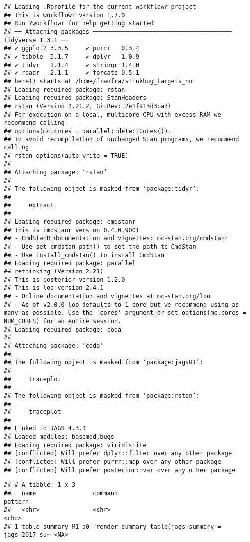 \documentclass[
]{article}
\begin{document}
\begin{verbatim}
## Loading .Rprofile for the current workflowr project
## This is workflowr version 1.7.0
## Run ?workflowr for help getting started
## ── Attaching packages ─────────────────────────────────────── tidyverse 1.3.1 ──
## ✔ ggplot2 3.3.5     ✔ purrr   0.3.4
## ✔ tibble  3.1.7     ✔ dplyr   1.0.9
## ✔ tidyr   1.1.4     ✔ stringr 1.4.0
## ✔ readr   2.1.1     ✔ forcats 0.5.1
## here() starts at /home/franfra/stinkbug_targets_nn
## Loading required package: rstan
## Loading required package: StanHeaders
## rstan (Version 2.21.2, GitRev: 2e1f913d3ca3)
## For execution on a local, multicore CPU with excess RAM we recommend calling
## options(mc.cores = parallel::detectCores()).
## To avoid recompilation of unchanged Stan programs, we recommend calling
## rstan_options(auto_write = TRUE)
## 
## Attaching package: ‘rstan’
## 
## The following object is masked from ‘package:tidyr’:
## 
##     extract
## 
## Loading required package: cmdstanr
## This is cmdstanr version 0.4.0.9001
## - CmdStanR documentation and vignettes: mc-stan.org/cmdstanr
## - Use set_cmdstan_path() to set the path to CmdStan
## - Use install_cmdstan() to install CmdStan
## Loading required package: parallel
## rethinking (Version 2.21)
## This is posterior version 1.2.0
## This is loo version 2.4.1
## - Online documentation and vignettes at mc-stan.org/loo
## - As of v2.0.0 loo defaults to 1 core but we recommend using as many as possible. Use the 'cores' argument or set options(mc.cores = NUM_CORES) for an entire session. 
## Loading required package: coda
## 
## Attaching package: ‘coda’
## 
## The following object is masked from ‘package:jagsUI’:
## 
##     traceplot
## 
## The following object is masked from ‘package:rstan’:
## 
##     traceplot
## 
## Linked to JAGS 4.3.0
## Loaded modules: basemod,bugs
## Loading required package: viridisLite
## [conflicted] Will prefer dplyr::filter over any other package
## [conflicted] Will prefer purrr::map over any other package
## [conflicted] Will prefer posterior::var over any other package
\end{verbatim}

\begin{verbatim}
## # A tibble: 1 x 3
##   name                command                                            pattern
##   <chr>               <chr>                                              <chr>  
## 1 table_summary_M1_b0 "render_summary_table(jags_summary = jags_2017_su~ <NA>
\end{verbatim}
\end{document}
